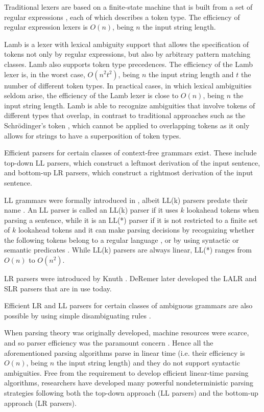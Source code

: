 \documentclass[preprint]{elsarticle}
\begin{document}
Traditional lexers are based on a finite-state machine that is built from a set of regular expressions \cite{McNaughton1960}, each of which describes a token type.
The efficiency of regular expression lexers is $O(n)$, being $n$ the input string length.

Lamb \cite{Quesada2011a} is a lexer with lexical ambiguity support that allows the specification of tokens not only by regular expressions, but also by arbitrary pattern matching classes.
Lamb also supports token type precedences.
The efficiency of the Lamb lexer is, in the worst case, $O(n^2t^2)$, being $n$ the input string length and $t$ the number of different token types.
In practical cases, in which lexical ambiguities seldom arise, the efficiency of the Lamb lexer is close to $O(n)$, being $n$ the input string length.
Lamb is able to recognize ambiguities that involve tokens of different types that overlap, in contrast to traditional approaches such as the Schr{\"o}dinger's token \cite{Aycock2001}, which cannot be applied to overlapping tokens as it only allows for strings to have a superposition of token types.

Efficient parsers for certain classes of context-free grammars exist.
These include top-down LL parsers, which construct a leftmost derivation of the input sentence, and bottom-up LR parsers, which construct a rightmost derivation of the input sentence.

LL grammars were formally introduced in \cite{Lewis1968}, albeit LL(k) parsers predate their name \cite{Oettinger1961}.
An LL parser is called an LL(k) parser if it uses $k$ lookahead tokens when parsing a sentence, while it is an LL(*) parser if it is not restricted to a finite set of $k$ lookahead tokens and it can make parsing decisions by recognizing whether the following tokens belong to a regular language \cite{Jarzabek1975,Nijholt1976}, or by using syntactic or semantic predicates \cite{Parr1995}.
While LL(k) parsers are always linear, LL(*) ranges from $O(n)$ to $O(n^2)$.

LR parsers were introduced by Knuth \cite{Knuth1965}.
DeRemer later developed the LALR \cite{DeRemer1969,DeRemer1982} and SLR \cite{DeRemer1971} parsers that are in use today.

Efficient LR and LL parsers for certain classes of ambiguous grammars are also possible by using simple disambiguating rules \cite{Aho1975,Earley1975}.

When parsing theory was originally developed, machine resources were scarce, and so parser efficiency was the paramount concern \cite{Parr2011}.
Hence all the aforementioned parsing algorithms parse in linear time (i.e. their efficiency is $O(n)$, being $n$ the input string length) and they do not support syntactic ambiguities.
Free from the requirement to develop efficient linear-time parsing algorithms, researchers have developed many powerful nondeterministic parsing strategies following both the top-down approach (LL parsers) and the bottom-up approach (LR parsers).
\end{document}
